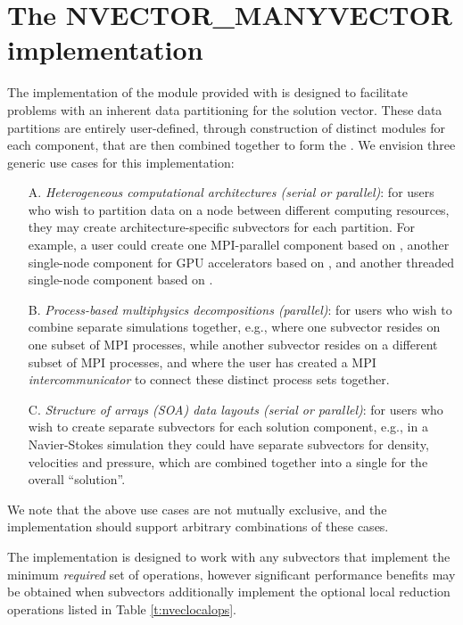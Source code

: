 %
\section{The NVECTOR\_MANYVECTOR implementation}\label{ss:nvec_manyvector}

The {\nvecmanyvector} implementation of the {\nvector} module provided
with {\sundials} is designed to facilitate problems with an inherent
data partitioning for the solution vector.  These data partitions are
entirely user-defined, through construction of distinct {\nvector}
modules for each component, that are then combined together to form
the {\nvecmanyvector}.  We envision three generic use cases for this
implementation:
\begin{itemize}
\item[A.] \emph{Heterogeneous computational architectures (serial or
    parallel)}: for users who wish to partition data on a node between
  different computing resources, they may create architecture-specific
  subvectors for each partition.  For example, a user could create one
  MPI-parallel component based on {\nvecp}, another single-node
  component for GPU accelerators based on {\nveccuda}, and another
  threaded single-node component based on {\nvecopenmp}.
\item[B.] \emph{Process-based multiphysics decompositions (parallel)}: for
  users who wish to combine separate simulations together, e.g., where
  one subvector resides on one subset of MPI processes, while another
  subvector resides on a different subset of MPI processes, and where
  the user has created a MPI \emph{intercommunicator} to connect these
  distinct process sets together.
\item[C.] \emph{Structure of arrays (SOA) data layouts (serial or
    parallel)}: for users who wish to create separate subvectors for
  each solution component, e.g., in a Navier-Stokes simulation they
  could have separate subvectors for density, velocities and
  pressure, which are combined together into a single
  {\nvecmanyvector} for the overall ``solution''. 
\end{itemize}
We note that the above use cases are not mutually exclusive, and the
{\nvecmanyvector} implementation should support arbitrary combinations
of these cases.

The {\nvecmanyvector} implementation is designed to work with any
{\nvector} subvectors that implement the minimum \emph{required} set
of operations, however significant performance benefits may be
obtained when subvectors additionally implement the optional local
reduction operations listed in Table \ref{t:nveclocalops}.

